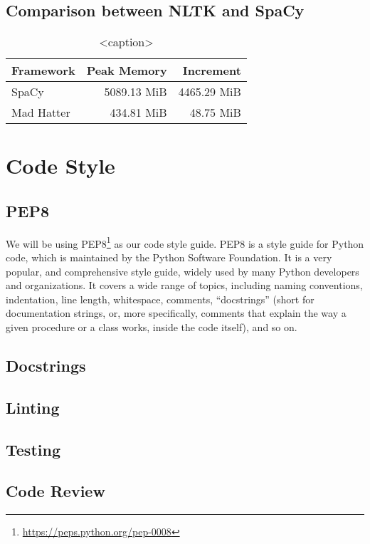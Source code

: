 \subsection*{Comparison between NLTK and SpaCy}
\begin{table}[htbp]
    \centering
        \begin{tabular}{lrr}
            \toprule
            Framework  &  Peak Memory  &     Increment \\
            \midrule
                SpaCy  &  5089.13 MiB  &   4465.29 MiB \\
            Mad Hatter &  434.81 MiB   &     48.75 MiB \\
            \bottomrule
            \end{tabular}
    \caption{<caption>}
    \label{<label>}
\end{table}

\section{Code Style}
\subsection{PEP8}
We will be using PEP8\footnote{\url{https://peps.python.org/pep-0008}} \citep{pep8} as our code style guide. PEP8 is a style guide for Python code, which is maintained by the Python Software Foundation. It is a very popular, and comprehensive style guide, widely used by many Python developers and organizations. It covers a wide range of topics, including naming conventions, indentation, line length, whitespace, comments, ``docstrings'' (short for documentation strings, or, more specifically, comments that explain the way a given procedure or a class works, inside the code itself), and so on.
\subsection{Docstrings}
\subsection{Linting}
\subsection{Testing}
\subsection{Code Review}
